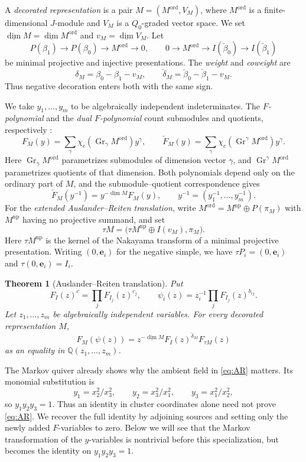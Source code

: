 \documentclass[11pt]{amsart}
\numberwithin{equation}{section}
\newtheorem{theorem}{Theorem}[section]
\theoremstyle{definition}
\theoremstyle{remark}
\newcommand{\op}[1]{\operatorname{#1}}
\newcommand{\Gr}{\op{Gr}}
\newcommand{\QQ}{\mathbb Q}
\newcommand{\dv}{\underline{\dim}}
\begin{document}
A \emph{decorated representation} is a pair $M=(M^{\mathrm{ord}},V_M)$,
where $M^{\mathrm{ord}}$ is a finite-dimensional $J$-module and
$V_M$ is a $Q_0$-graded vector space. We set
$\dv M=\dv M^{\mathrm{ord}}$ and $v_M=\dv V_M$.
Let
\[ P(\beta_1)\longrightarrow P(\beta_0)\longrightarrow M^{\mathrm{ord}}\longrightarrow0,
\qquad 0\longrightarrow M^{\mathrm{ord}}\longrightarrow I(\check\beta_0)\longrightarrow I(\check\beta_1) \]
be minimal projective and injective presentations. The \emph{weight} and
\emph{coweight} are
\[ \delta_M=\beta_0-\beta_1-v_M,\qquad
\check\delta_M=\check\beta_0-\check\beta_1-v_M. \]
Thus negative decoration enters both with the same sign.

We take $y_1,\ldots,y_m$ to be algebraically independent indeterminates.
The \emph{$F$-polynomial} and the \emph{dual $F$-polynomial} count
submodules and quotients, respectively \cite[Section~3]{DWZ10}:
\[ F_M(y)=\sum_{\gamma}\chi_c(\Gr_{\gamma}M^{\mathrm{ord}})y^{\gamma},\qquad \check F_M(y)=\sum_{\gamma}\chi_c(\Gr^{\gamma}M^{\mathrm{ord}})y^{\gamma}. \]
Here $\Gr_{\gamma}M^{\mathrm{ord}}$ parametrizes submodules of dimension
vector $\gamma$, and $\Gr^{\gamma}M^{\mathrm{ord}}$ parametrizes
quotients of that dimension.
Both polynomials depend only on the ordinary part of $M$, and the
submodule--quotient correspondence gives
\[ \check F_M(y^{-1})=y^{-\dv M}F_M(y),\qquad y^{-1}=(y_1^{-1},\ldots,y_m^{-1}). \]
For the \emph{extended Auslander--Reiten translation}, write
$M^{\mathrm{ord}}=M^{\mathrm{np}}\oplus P(\pi_M)$ with
$M^{\mathrm{np}}$ having no projective summand, and set
\[ \tau M=\bigl(\tau M^{\mathrm{np}}\oplus I(v_M),\pi_M\bigr). \]
Here $\tau M^{\mathrm{np}}$ is the kernel of the Nakayama transform of a
minimal projective presentation. Writing $(0,\mathbf e_i)$ for the
negative simple, we have $\tau P_i=(0,\mathbf e_i)$ and
$\tau(0,\mathbf e_i)=I_i$.

\begin{theorem}[Auslander--Reiten translation]
\label{thm:AR}
Put
\[ F_I(z)^c=\prod_jF_{I_j}(z)^{c_j},\qquad \psi_i(z)=z_i^{-1}\prod_jF_{I_j}(z)^{b_{ij}}. \]
Let $z_1,\ldots,z_m$ be algebraically independent variables.
For every decorated representation $M$,
\begin{equation}\label{eq:AR} F_M(\psi(z))=z^{-\dv M}F_I(z)^{\check\delta_M}F_{\tau M}(z)\end{equation}
as an equality in $\QQ(z_1,\ldots,z_m)$.
\end{theorem}

The Markov quiver already shows why the ambient field in
\eqref{eq:AR} matters. Its
monomial substitution is
\begin{equation}\label{eq:markov-y} y_1=x_2^2/x_3^2,\qquad y_2=x_3^2/x_1^2,\qquad y_3=x_1^2/x_2^2,\end{equation}
so $y_1y_2y_3=1$. Thus an identity in cluster coordinates alone need
not prove \eqref{eq:AR}. We recover the full identity by adjoining sources
and setting only the newly added $F$-variables to zero. Below we will
see that the Markov transformation of the $y$-variables is nontrivial
before this specialization, but becomes the identity on
$y_1y_2y_3=1$.
\end{document}
